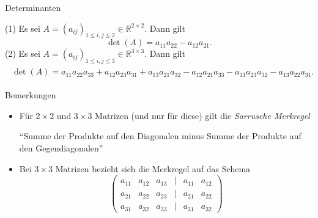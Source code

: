 \documentclass[
  8pt,
  ignorenonframetext,
]{beamer}
\providecommand{\tightlist}{%
  \setlength{\itemsep}{0pt}\setlength{\parskip}{0pt}}
\begin{document}
\begin{frame}{Determinanten}
\protect\hypertarget{determinanten-1}{}
\footnotesize
{}
\begin{theorem}
\normalfont
(1) Es sei $A = (a_{ij})_{1 \le i,j \le 2} \in \mathbb{R}^{2 \times 2}$. Dann gilt
\begin{equation}
\det(A)
= a_{11}a_{22} - a_{12}a_{21}.
\end{equation}
(2) Es sei $A = (a_{ij})_{1 \le i,j \le 3} \in \mathbb{R}^{3 \times 3}$. Dann gilt
\begin{align}
\begin{split}
\det(A)
= a_{11}a_{22}a_{33} + a_{12}a_{23}a_{31} + a_{13}a_{21}a_{32}
- a_{12}a_{21}a_{33} - a_{11}a_{23}a_{32} - a_{13}a_{22}a_{31}.
\end{split}
\end{align}
\end{theorem}

Bemerkungen

\begin{itemize}
\tightlist
\item
  Für \(2 \times 2\) und \(3 \times 3\) Matrizen (und nur für diese)
  gilt die \emph{Sarrusche Merkregel}

  \begin{center}
  ``Summe der Produkte auf den Diagonalen minus Summe der Produkte auf den Gegendiagonalen''
  \end{center}
\item
  Bei \(3 \times 3\) Matrizen bezieht sich die Merkregel auf das Schema
  \begin{equation}
  \begin{pmatrix}
  a_{11} & a_{12} & a_{13} & \vert & a_{11} & a_{12} \\
  a_{21} & a_{22} & a_{23} & \vert & a_{21} & a_{22} \\
  a_{31} & a_{32} & a_{33} & \vert & a_{31} & a_{32}
  \end{pmatrix}
  \end{equation}
\end{itemize}
\end{frame}
\end{document}
